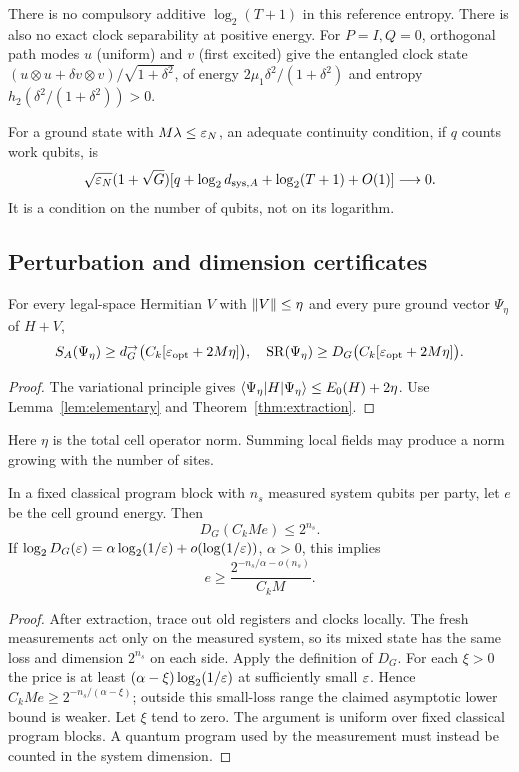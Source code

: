 There is no compulsory additive $\log_2(T+1)$ in this reference
entropy. There is also no exact clock separability at positive energy.
For $P=I,Q=0$, orthogonal path modes $u$ (uniform) and $v$ (first
excited) give the entangled clock state
$(u\otimes u+\delta v\otimes v)/\sqrt{1+\delta^2}$, of energy
$2\mu_1\delta^2/(1+\delta^2)$ and entropy
$h_2(\delta^2/(1+\delta^2))>0$.

For a ground state with $M\lambda\leq\varepsilon_N$, an adequate continuity
condition, if $q$ counts work qubits, is
\[
 \sqrt{\varepsilon_N}(1+\sqrt G)
       [q+\log_2d_{{\rm sys},A}+\log_2(T+1)+O(1)]\longrightarrow0.
\]
It is a condition on the number of qubits, not on its logarithm.

\subsection{Perturbation and dimension certificates}\label{sec:certificates}
\begin{corollary}\label{cor:perturbed}
For every legal-space Hermitian $V$ with $\lVert V\rVert\leq\eta$ and every
pure ground vector $\Psi_\eta$ of $H+V$,
\[
 S_A(\Psi_\eta)\geq d_G^{\to}\bigl(C_k[\varepsilon_{\rm opt}+2M\eta]\bigr),
 \quad \operatorname{SR}(\Psi_\eta)\geq D_G\bigl(C_k[\varepsilon_{\rm opt}+2M\eta]\bigr).
\]
\end{corollary}
\begin{proof}
The variational principle gives
$\langle\Psi_\eta\rvert H\lvert\Psi_\eta\rangle\leq E_0(H)+2\eta$.
Use Lemma~\ref{lem:elementary} and Theorem~\ref{thm:extraction}.
\end{proof}
Here $\eta$ is the total cell operator norm. Summing local fields may
produce a norm growing with the number of sites.

\begin{proposition}\label{prop:frustration}
In a fixed classical program block with $n_s$ measured system qubits
per party, let $e$ be the cell ground energy. Then
\[
 D_G(C_kMe)\leq2^{n_s}.
\]
If $\log_2D_G(\varepsilon)=\alpha\log_2(1/\varepsilon)+o(\log(1/\varepsilon))$,
$\alpha>0$, this implies
\begin{equation}\label{eq:frustration}
 e\geq\frac{2^{-n_s/\alpha-o(n_s)}}{C_kM}.
\end{equation}
\end{proposition}
\begin{proof}
After extraction, trace out old registers and clocks locally. The
fresh measurements act only on the measured system, so its mixed
state has the same loss and dimension $2^{n_s}$ on each side. Apply
the definition of $D_G$. For each $\xi>0$ the price is at least
$(\alpha-\xi)\log_2(1/\varepsilon)$ at sufficiently small $\varepsilon$.
Hence $C_kMe\geq2^{-n_s/(\alpha-\xi)}$; outside this small-loss range
the claimed asymptotic lower bound is weaker. Let $\xi$ tend to zero.
The argument is uniform over fixed classical program blocks. A quantum
program used by the measurement must instead be counted in the system
dimension.
\end{proof}

